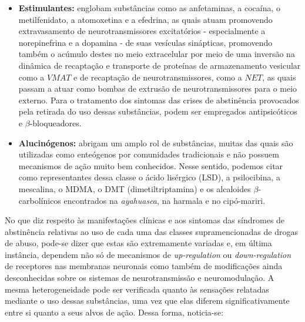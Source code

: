 \documentclass[
]{book}
\theoremstyle{definition}
\theoremstyle{definition}
\theoremstyle{definition}
\theoremstyle{definition}
\theoremstyle{remark}
\begin{document}
\begin{itemize}
\item
  \textbf{Estimulantes:} englobam substâncias como as anfetaminas, a cocaína, o metilfenidato, a atomoxetina e a efedrina, as quais atuam promovendo extravasamento de neurotransmissores excitatórios - especialmente a norepinefrina e a dopamina - de suas vesículas sinápticas, promovendo também o acúmulo destes no meio extracelular por meio de uma inversão na dinâmica de recaptação e transporte de proteínas de armazenamento vesicular como a \(VMAT\) e de recaptação de neurotransmissores, como a \(NET\), as quais passam a atuar como bombas de extrusão de neurotransmissores para o meio externo. Para o tratamento dos sintomas das crises de abstinência provocados pela retirada do uso dessas substâncias, podem ser empregados antipsicóticos e \(\beta\)-bloqueadores.
\item
  \textbf{Alucinógenos:} abrigam um amplo rol de substâncias, muitas das quais são utilizadas como enteógenos por comunidades tradicionais e não possuem mecanismos de ação muito bem conhecidos. Nesse sentido, podemos citar como representantes dessa classe o ácido lisérgico (LSD), a psilocibina, a mescalina, o MDMA, o DMT (dimetiltriptamina) e os alcaloides \(\beta\)-carbolínicos encontrados na \emph{ayahuasca}, na harmala e no cipó-mariri.
\end{itemize}

No que diz respeito às manifestações clínicas e aos sintomas das síndromes de abstinência relativas ao uso de cada uma das classes supramencionadas de drogas de abuso, pode-se dizer que estas são extremamente variadas e, em última instância, dependem não só de mecanismos de \emph{up-regulation} ou \emph{down-regulation} de receptores nas membranas neuronais como também de modificações ainda desconhecidas sobre os sistemas de neurotransmissão e neuromodulação. A mesma heterogeneidade pode ser verificada quanto às sensações relatadas mediante o uso dessas substâncias, uma vez que elas diferem significativamente entre si quanto a seus alvos de ação. Dessa forma, noticia-se:
\end{document}
